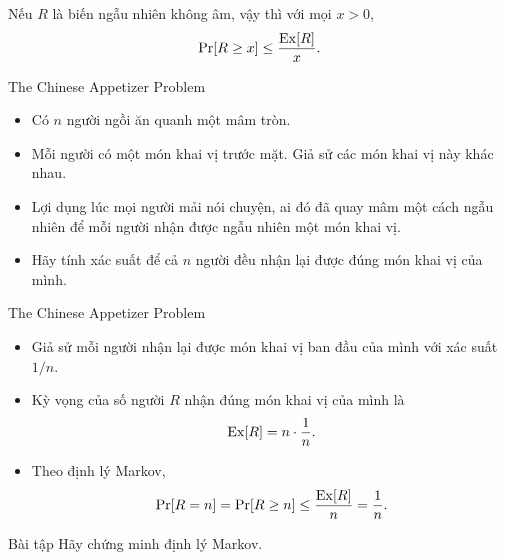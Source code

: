 \begin{frame}
	\begin{thrm}[Markov]
		Nếu $R$ là biến ngẫu nhiên \alert{không âm}, vậy thì với mọi $x > 0$,
		\[
			\mathrm{Pr}[R \geq x] \leq \frac{\mathrm{Ex}[R]}{x}.
		\] 
	\end{thrm}
\end{frame}

\begin{frame}{The Chinese Appetizer Problem}
	\begin{itemize}
		\item Có $n$ người ngồi ăn quanh một mâm tròn. 
		\item<+-> Mỗi người có một món khai vị trước mặt. Giả sử các món khai vị này khác nhau.
		\item Lợi dụng lúc mọi người mải nói chuyện, ai đó đã quay mâm một cách ngẫu nhiên để mỗi người nhận được ngẫu nhiên một món khai vị.
		\item Hãy tính xác suất để cả $n$ người đều nhận lại được đúng món khai vị của mình. 
	\end{itemize}
\end{frame}

\begin{frame}{The Chinese Appetizer Problem}
	\begin{itemize}
		\item<+->  Giả sử mỗi người nhận lại được món khai vị ban đầu của mình với xác suất $1/n$.
		\item<+->  Kỳ vọng của số người $R$ nhận đúng món khai vị của mình là 
		\[
			\mathrm{Ex}[R] = n\cdot \frac{1}{n}.
		\]  
		
		\item<+-> Theo định lý Markov,
		\[
			\mathrm{Pr}[R =n] = \mathrm{Pr}[R \geq n] \leq \frac{\mathrm{Ex}[R]}{n} = \frac{1}{n}.
		\] 
	\end{itemize}
\end{frame}

\begin{frame}{Bài tập}
	Hãy chứng minh định lý Markov.
\end{frame}

